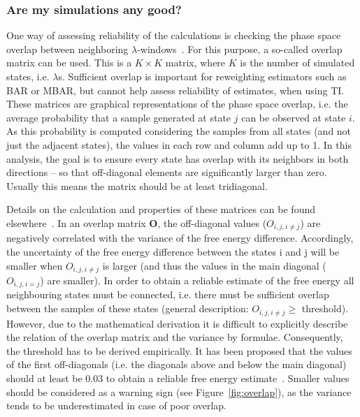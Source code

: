 \documentclass[9pt,bestpractices]{livecoms}
\begin{document}
\subsubsection{Are my simulations any good?}
One way of assessing reliability of the calculations is checking the phase space overlap between neighboring $\lambda$-windows~\cite{wu2005phasespace,wu2005phasespacea}. For this purpose, a so-called overlap matrix can be used. This is a $K\times K$ matrix, where $K$ is the number of simulated states, i.e. $\lambda$s. Sufficient overlap is important for reweighting estimators such as BAR or MBAR, but cannot help assess reliability of estimates, when using TI. 
These matrices are graphical representations of the phase space overlap, i.e. the average probability that a sample generated at state $j$ can be observed at state $i$. As this probability is computed considering the samples from all states (and not just the adjacent states), the values in each row and column add up to 1. In this analysis, the goal is to ensure every state has overlap with its neighbors in both directions -- so that off-diagonal elements are significantly larger than zero. Usually this means the matrix should be at least tridiagonal.

Details on the calculation and properties of these matrices can be found elsewhere~\cite{klimovich2015guidelines}.
In an overlap matrix $\mathbf{O}$, the off-diagonal values (${O}_{i,j,i\ne j}$) are negatively correlated with the variance of the free energy difference. Accordingly, the uncertainty of the free energy difference between the states i and j will be smaller when ${O}_{i,j,i\ne j}$ is larger (and thus the values in the main diagonal (${O}_{i,j,i=j}$) are smaller). In order to obtain a reliable estimate of the free energy all neighbouring states must be connected, i.e. there must be sufficient overlap between the samples of these states (general description: ${O}_{i,j,i\ne j}\ge$ threshold).
However, due to the mathematical derivation it is difficult to explicitly describe the relation of the overlap matrix and the variance by formulae. Consequently, the threshold has to be derived empirically. It has been proposed that the values of the first off-diagonals (i.e. the diagonals above and below the main diagonal) should at least be 0.03 to obtain a reliable free energy estimate~\cite{klimovich2015guidelines}. Smaller values should be considered as a warning sign (see Figure~\ref{fig:overlap}), as the variance tends to be underestimated in case of poor overlap.
\end{document}
